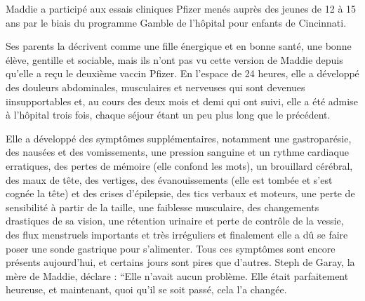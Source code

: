 Maddie a participé aux essais cliniques Pfizer menés auprès des jeunes de 12 à
15 ans par le biais du programme Gamble de l'hôpital pour enfants de Cincinnati.

Ses parents la décrivent comme une fille énergique et en bonne santé, une bonne
élève, gentille et sociable, mais ils n'ont pas vu cette version de Maddie
depuis qu'elle a reçu le deuxième vaccin Pfizer. En l'espace de 24 heures, elle
a développé des douleurs abdominales, musculaires et nerveuses qui sont devenues
iinsupportables et, au cours des deux mois et demi qui ont suivi, elle a été
admise à l'hôpital trois fois, chaque séjour étant un peu plus long que le
précédent.

Elle a développé des symptômes supplémentaires, notamment une gastroparésie, des
nausées et des vomissements, une pression sanguine et un rythme cardiaque
erratiques, des pertes de mémoire (elle confond les mots), un brouillard
cérébral, des maux de tête, des vertiges, des évanouissements (elle est tombée
et s'est cognée la tête) et des crises d'épilepsie, des tics verbaux et moteurs,
une perte de sensibilité à partir de la taille, une faiblesse musculaire, des
changements drastiques de sa vision, une rétention urinaire et perte de contrôle
de la vessie, des flux menstruels importants et très irréguliers et finalement
elle a dû se faire poser une sonde gastrique pour s'alimenter. Tous ces
symptômes sont encore présents aujourd'hui, et certains jours sont pires que
d'autres. Steph de Garay, la mère de Maddie, déclare : “Elle n'avait aucun
problème. Elle était parfaitement heureuse, et maintenant, quoi qu'il se soit
passé, cela l'a changée.

